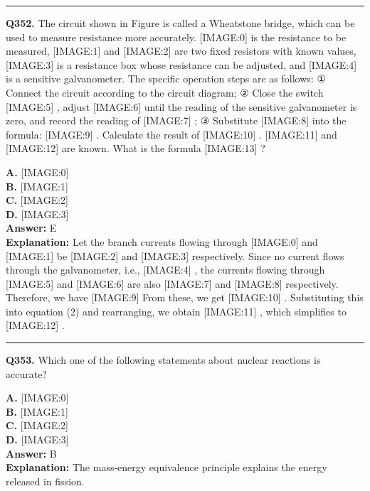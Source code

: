 \documentclass[12pt]{article}
\begin{document}
\hrule
\vspace{1em}


\noindent
\textbf{Q352.} The circuit shown in Figure is called a Wheatstone bridge, which can be used to measure resistance more accurately.
[IMAGE:0]
is the resistance to be measured,
[IMAGE:1]
and
[IMAGE:2]
are two fixed resistors with known values,
[IMAGE:3]
is a resistance box whose resistance can be adjusted, and
[IMAGE:4]
is a sensitive galvanometer. The specific operation steps are as follows:
① Connect the circuit according to the circuit diagram;
② Close the switch
[IMAGE:5]
, adjust
[IMAGE:6]
until the reading of the sensitive galvanometer is zero, and record the reading of
[IMAGE:7]
;
③ Substitute
[IMAGE:8]
into the formula:
[IMAGE:9]
. Calculate the result of
[IMAGE:10]
.
[IMAGE:11]
and
[IMAGE:12]
are known.
What is the formula
[IMAGE:13]
?



\textbf{A.} [IMAGE:0] \\
\textbf{B.} [IMAGE:1] \\
\textbf{C.} [IMAGE:2] \\
\textbf{D.} [IMAGE:3] \\

\textbf{Answer:} E \\
\textbf{Explanation:} Let the branch currents flowing through
[IMAGE:0]
and
[IMAGE:1]
be
[IMAGE:2]
and
[IMAGE:3]
respectively. Since no current flows through the galvanometer, i.e.,
[IMAGE:4]
, the currents flowing through
[IMAGE:5]
and
[IMAGE:6]
are also
[IMAGE:7]
and
[IMAGE:8]
respectively. Therefore, we have
[IMAGE:9]
From these, we get
[IMAGE:10]
. Substituting this into equation (2) and rearranging, we obtain
[IMAGE:11]
, which simplifies to
[IMAGE:12]
.

\hrule
\vspace{1em}


\noindent
\textbf{Q353.} Which one of the following statements about nuclear reactions is accurate?



\textbf{A.} [IMAGE:0] \\
\textbf{B.} [IMAGE:1] \\
\textbf{C.} [IMAGE:2] \\
\textbf{D.} [IMAGE:3] \\

\textbf{Answer:} B \\
\textbf{Explanation:} The mass-energy equivalence principle explains the energy released in fission.
\end{document}
